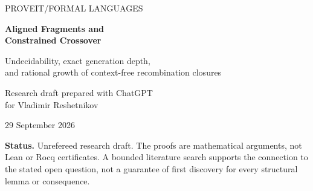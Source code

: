 \documentclass[11pt,letterpaper]{article}
\theoremstyle{definition}
\theoremstyle{remark}
\newcommand{\cut}{\otimes_{\mathrm c}}
\newcommand{\rank}{\rho}
\begin{document}
\hypersetup{pageanchor=false}
\begin{titlepage}
\thispagestyle{empty}
\vspace*{0.35in}
{\sffamily\color{Accent}\large PROVEIT\quad /\quad FORMAL LANGUAGES}\par
\vspace{0.55in}
{\Huge\bfseries\color{Ink}Aligned Fragments and\\[0.12em]Constrained Crossover}\par
\vspace{0.3in}
{\Large Undecidability, exact generation depth,\\[0.25em]
and rational growth of context-free recombination closures}\par
\vspace{0.45in}
{\large Research draft prepared with ChatGPT\\for Vladimir Reshetnikov}\par
\vspace{0.12in}
29 September 2026
\vspace{0.4in}
\begin{abstract}
For equal-length words, constrained one-point crossover exchanges suffixes at
the same position. We prove that deciding whether a context-free language
satisfies $L\cut L=L$ is co-recursively-enumerable-complete, already over a
fixed three-letter alphabet. This answers the decision question explicitly
left open in Section~4 of Hughes, arXiv:2608.27755v1. A delimiter amplification
also proves undecidability of eventual finite stabilization, with an exact
rank-$r+1$ witness built from $r$ omitted blocks.

The structural invariant is the least number $\rank_L(w)$ of consecutive
fragments of $w$ that occur at the same positions in seed words of the same
length. For parallel self-crossover we prove
$\rank_{L\cut L}(w)=\lceil\rank_L(w)/2\rceil$ and hence exact generation depth
$\lceil\log_2\rank_L(w)\rceil$. Rank spectra have no gaps, and every
length-$n$ slice stabilizes by $\lceil\log_2 n\rceil$, sharply.

For regular inputs, one-step closure has a polynomial-time DFA test and is
PSPACE-complete for NFAs; finite stabilization reduces to the classical
limitedness problem for distance automata. For every context-free seed, the
full closure has an effectively rational commutative generating function.
Nevertheless, an explicit binary linear context-free seed has a closure that
is not context-free. Its finite generations have polynomial growth and
minimal recurrence order $q2^k+1$, whereas the limit has exponential growth.
Complete proofs, exact finite audits, and a research agenda are included.
\end{abstract}
\vfill
\noindent\small\color{Muted}
\textbf{Status.} Unrefereed research draft. The proofs are mathematical arguments,
not Lean or Rocq certificates. A bounded literature search supports the
connection to the stated open question, not a guarantee of first discovery
for every structural lemma or consequence.


\end{titlepage}
\end{document}
